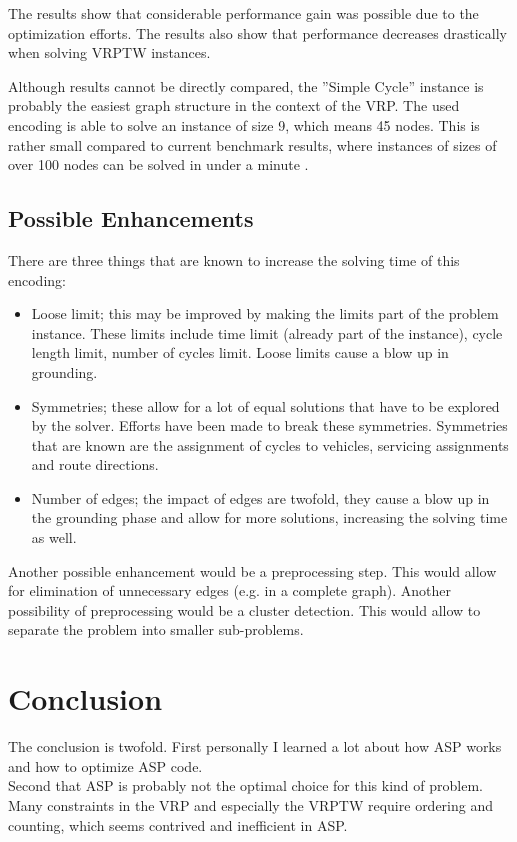 \documentclass[12pt, letterpaper]{article}
\begin{document}
The results show that considerable performance gain was possible due to the optimization efforts. The results also show that performance decreases drastically when solving VRPTW instances.

Although results cannot be directly compared, the ''Simple Cycle'' instance is probably the easiest graph structure in the context of the VRP. The used encoding is able to solve an instance of size 9, which means 45 nodes. This is rather small compared to current benchmark results, where instances of sizes of over 100 nodes can be solved in under a minute \cite{benchmark}.

\subsection{Possible Enhancements}
There are three things that are known to increase the solving time of this encoding:
\begin{itemize}
	\item Loose limit; this may be improved by making the limits part of the problem instance. These limits include time limit (already part of the instance), cycle length limit, number of cycles limit. Loose limits cause a blow up in grounding.
	\item Symmetries; these allow for a lot of equal solutions that have to be explored by the solver. Efforts have been made to break these symmetries. Symmetries that are known are the assignment of cycles to vehicles, servicing assignments and route directions.
	\item Number of edges; the impact of edges are twofold, they cause a blow up in the grounding phase and allow for more solutions, increasing the solving time as well.
\end{itemize}

Another possible enhancement would be a preprocessing step. This would allow for elimination of unnecessary edges (e.g. in a complete graph). Another possibility of preprocessing would be a cluster detection. This would allow to separate the problem into smaller sub-problems.

\section{Conclusion}
The conclusion is twofold. First personally I learned a lot about how ASP works and how to optimize ASP code.\\
Second that ASP is probably not the optimal choice for this kind of problem. Many constraints in the VRP and especially the VRPTW require ordering and counting, which seems contrived and inefficient in ASP.



\end{document}
